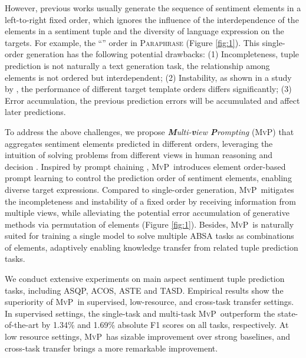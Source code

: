 \documentclass[11pt]{article}
\newcommand\mvp{\textsc{MvP}}
\begin{document}
However, previous works usually generate the sequence of sentiment elements in a left-to-right fixed order, which ignores the influence of the interdependence of the elements in a sentiment tuple and the diversity of language expression on the targets.
For example, the ``'' order in \textsc{Paraphrase} \cite{zhang-etal-2021-aspect-sentiment} (Figure \ref{fig:1}). 
This single-order generation has the following potential drawbacks:
(1) Incompleteness, tuple prediction is not naturally a text generation task, the relationship among elements is not ordered but interdependent;
(2) Instability, as shown in a study by \citet{hu-etal-2022-improving-aspect}, the performance of different target template orders differs significantly; 
(3) Error accumulation, the previous prediction errors will be accumulated and affect later predictions.


To address the above challenges, we propose \emph{\textbf{M}ulti-\textbf{v}iew \textbf{P}rompting} (\mvp)
that aggregates sentiment elements predicted in different orders,
leveraging the intuition of solving problems from different views in human reasoning and decision \cite{stanovich2000individual}.
Inspired by prompt chaining \cite{DBLP:journals/corr/abs-2107-13586, DBLP:journals/corr/abs-2201-11903, DBLP:journals/corr/abs-2203-11171, DBLP:journals/corr/abs-2207-00747},
\mvp~introduces element order-based prompt learning
to control the prediction order of sentiment elements, enabling diverse target expressions.
Compared to single-order generation, \mvp~mitigates the incompleteness and instability of a fixed order by receiving information from multiple views, while alleviating the potential error accumulation of generative methods via permutation of elements (Figure \ref{fig:1}).
Besides, \mvp~is naturally suited for training a single model to solve multiple ABSA tasks as combinations of elements, adaptively enabling knowledge transfer from related tuple prediction tasks.




We conduct extensive experiments on main aspect sentiment tuple prediction tasks, including ASQP, ACOS, ASTE and TASD.
Empirical results show the superiority of \mvp~in supervised, low-resource, and cross-task transfer settings.
In supervised settings, the single-task and multi-task \mvp~outperform the state-of-the-art by 1.34\% and 1.69\% absolute F1 scores on all tasks, respectively. 
At low resource settings, \mvp~has sizable improvement over strong baselines, and cross-task transfer brings a more remarkable improvement.
\end{document}
